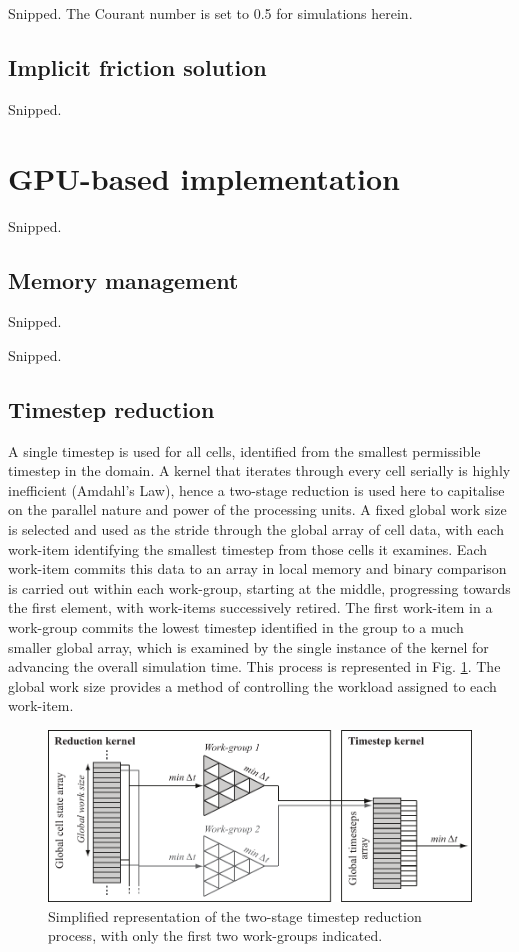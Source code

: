 Snipped. The Courant number is set to 0.5 for simulations herein. 

\subsection{Implicit friction solution}

Snipped.

\section{GPU-based implementation}

Snipped.

\subsection{Memory management}

Snipped.

Snipped.

\subsection{Timestep reduction}

A single timestep is used for all cells, identified from the smallest permissible timestep in the domain. A kernel that iterates through every cell serially is highly inefficient (Amdahl's Law), hence a two-stage reduction is used here to capitalise on the parallel nature and power of the processing units. A fixed global work size is selected and used as the stride through the global array of cell data, with each work-item identifying the smallest timestep from those cells it examines. Each work-item commits this data to an array in local memory and binary comparison is carried out within each work-group, starting at the middle, progressing towards the first element, with work-items successively retired. The first work-item in a work-group commits the lowest timestep identified in the group to a much smaller global array, which is examined by the single instance of the kernel for advancing the overall simulation time. This process is represented in Fig. \ref{ReductionProcess}. The global work size provides a method of controlling the workload assigned to each work-item.

\begin{figure}[tpb]
\centering
\includegraphics[width=1.0\textwidth]{heterogeneous-dev-figures/Figure_6_Greyscale.pdf}
\caption{Simplified representation of the two-stage timestep reduction process, with only the first two work-groups indicated.}
\label{ReductionProcess}
\end{figure}

